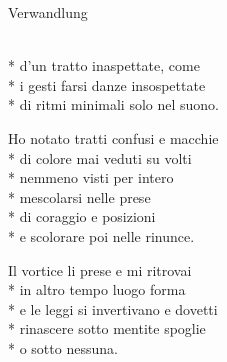 \documentclass[12pt]{book}
\begin{document}
\begin{poem}{Verwandlung}{}

\settowidth{\versewidth}{non meno è ciò che meriti.}


\begin{altverse}
\\*
d'un tratto inaspettate, come \\*
i gesti farsi danze insospettate \\*
di ritmi minimali solo nel suono. 
\end{altverse}

\begin{altverse}
Ho notato tratti confusi e macchie\\*
di colore mai veduti su volti\\*
nemmeno visti per intero\\*
mescolarsi nelle prese\\*
di coraggio e posizioni\\*
e scolorare poi nelle rinunce.
\end{altverse}

\begin{altverse}
Il vortice li prese e mi ritrovai\\*
in altro tempo luogo forma\\*
e le leggi si invertivano e dovetti\\*
rinascere sotto mentite spoglie\\*
o sotto nessuna.
\end{altverse}
\end{poem}
\end{document}
